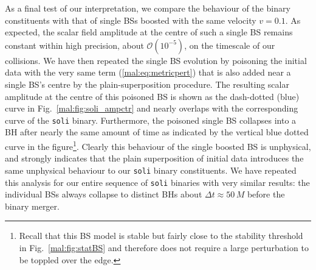 As a final test of our interpretation, we compare the behaviour
of the binary constituents with that of single BSs boosted with the
same velocity $v=0.1$. As expected, the scalar field amplitude at
the centre of such a single BS remains constant within high precision,
about $\mathcal{O}(10^{-5})$, on the timescale of our collisions.
We have then repeated the single BS evolution by poisoning the initial
data with the very same term (\ref{mal:eq:metricpert}) that is also
added near a single BS's centre by the plain-superposition procedure.
The resulting scalar amplitude at the centre of this poisoned
BS is shown as the dash-dotted (blue) curve in
Fig.~\ref{mal:fig:soli_ampctr} and nearly overlaps with the corresponding
curve of the {\tt soli} binary. Furthermore, the poisoned single
BS collapses into a BH after nearly the same amount of time as indicated
\setcounter{footnote}{4}
by the vertical blue dotted curve in the figure\footnote{
Recall that this BS model is stable but fairly close
to the stability threshold in Fig.~\ref{mal:fig:statBS}
and therefore does not require a large perturbation to be
toppled over the edge.}.
Clearly this
behaviour of the single boosted BS is unphysical, and strongly
indicates that the plain superposition of initial data introduces
the same unphysical behaviour to our {\tt soli} binary constituents.
We have repeated this analysis for our entire sequence of
{\tt soli} binaries with very similar results: the individual
BSs always collapse to distinct BHs about $\Delta t\approx 50\,M$
before the binary merger.

